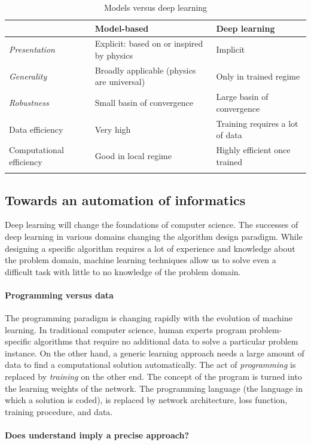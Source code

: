 \begin{longtable}[]{@{}lll@{}}
\toprule
& \textbf{Model-based} & \textbf{Deep learning}\tabularnewline
\midrule
\endhead
\emph{Presentation} & Explicit: based on or inspired by physics &
Implicit\tabularnewline
\emph{Generality} & Broadly applicable (physics are universal) & Only in
trained regime\tabularnewline
\emph{Robustness} & Small basin of convergence  & Large basin of convergence
\tabularnewline
Data efficiency & Very high &
Training requires a lot of data \tabularnewline
Computational efficiency & Good in local regime & Highly efficient once
trained\tabularnewline
\bottomrule
\caption{Models versus deep learning}
\end{longtable}

\newpage
\subsection{Towards an automation of informatics}\label{header-n80}

Deep learning will change the foundations of computer science. The
successes of deep learning in various domains changing the algorithm
design paradigm. While designing a specific algorithm requires a lot of
experience and knowledge about the problem domain, machine learning
techniques allow us to solve even a difficult task with little to no
knowledge of the problem domain.

\paragraph{Programming versus data}

The programming paradigm is changing rapidly with the evolution of
machine learning. In traditional computer science, human experts program
problem-specific algorithms that require no additional data to solve a
particular problem instance. On the other hand, a generic learning
approach needs a large amount of data to find a computational solution
automatically. The act of \emph{programming} is replaced by
\emph{training} on the other end. The concept of the program is turned
into the learning weights of the network. The programming language (the
language in which a solution is coded), is replaced by network
architecture, loss function, training procedure, and data.

\paragraph{Does understand imply a precise approach?}

